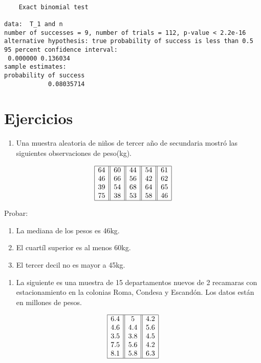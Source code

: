 \documentclass[
  a4paper,
  oneside,
  openany]{book}
\providecommand{\tightlist}{%
  \setlength{\itemsep}{0pt}\setlength{\parskip}{0pt}}
\begin{document}
\begin{verbatim}

    Exact binomial test

data:  T_1 and n
number of successes = 9, number of trials = 112, p-value < 2.2e-16
alternative hypothesis: true probability of success is less than 0.5
95 percent confidence interval:
 0.000000 0.136034
sample estimates:
probability of success 
            0.08035714 
\end{verbatim}

\hypertarget{ejercicios-1}{%
\section{Ejercicios}\label{ejercicios-1}}

\begin{enumerate}
\def\labelenumi{\arabic{enumi}.}
\tightlist
\item
  Una muestra aleatoria de niños de tercer año de secundaria mostró las siguientes observaciones de peso(kg).
\end{enumerate}

\[
\begin{array}{|c| |c| |c| |c| |c|} 
\hline
64& 60& 44& 54& 61\\
46& 66& 56& 42& 62\\
39& 54& 68& 64& 65\\
75& 38& 53& 58&46\\
\hline
\end{array}
\]

Probar:

\begin{enumerate}
\def\labelenumi{\alph{enumi})}
\item
  La mediana de los pesos es 46kg.
\item
  El cuartíl superior es al menos 60kg.
\item
  El tercer decil no es mayor a 45kg.
\end{enumerate}

\begin{enumerate}
\def\labelenumi{\arabic{enumi}.}
\setcounter{enumi}{1}
\tightlist
\item
  La siguiente es una muestra de 15 departamentos nuevos de 2 recamaras con estacionamiento en la colonias Roma, Condesa y Escandón. Los datos están en millones de pesos.
\end{enumerate}

\[
\begin{array}{|c| |c| |c|} 
\hline
6.4&    5&  4.2\\
4.6&    4.4&    5.6\\
3.5&    3.8&    4.5\\
7.5&    5.6&    4.2\\
8.1&    5.8&    6.3\\
\hline
\end{array}
\]
\end{document}
